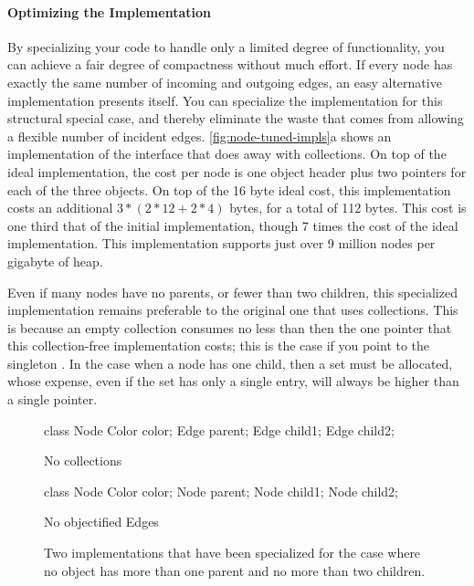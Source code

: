 \paragraph{Optimizing the Implementation}
By specializing your code to handle only a limited degree of functionality, you
can achieve a fair degree of compactness without much effort. If every node has
exactly the same number of incoming and outgoing edges, an easy alternative
implementation presents itself. You can specialize the implementation for this
structural special case, and thereby eliminate the waste that comes from allowing
a flexible number of incident edges.
\autoref{fig:node-tuned-impls}a shows an implementation of the 
interface that does away with collections. On top of the ideal implementation,
the cost per node is one object header plus two pointers for each of the three
 objects. On top of the 16 byte ideal cost, this implementation costs
an additional $3*(2*12 + 2*4)$ bytes, for a total of 112 bytes. This cost is one
third that of the initial implementation, though 7 times the cost of the ideal
implementation. This implementation supports just over 9 million nodes per
gigabyte of heap.

Even if many nodes have no parents, or fewer than two children, this specialized
implementation remains preferable to the original one that uses collections. This
is because an empty collection consumes no less than then the one pointer that
this collection-free implementation costs; this is the case if you point to the
singleton . In the case when a node has one child,
then a set must be allocated, whose expense, even if the set has only a single
entry, will always be higher than a single pointer.

\begin{figure}
\centering
\begin{subfloat}
\begin{minipage}[b]{0.38\textwidth}
\begin{shortlisting}
class Node {
   Color color;
   Edge parent;
   Edge child1;
   Edge child2;
}
\end{shortlisting}
\end{minipage}
\label{fig:node-no-collections}
\caption{No collections}
\end{subfloat}
\qquad
\begin{subfloat}
\begin{minipage}[b]{0.38\textwidth}
\begin{shortlisting}
class Node {
   Color color;
   Node parent;
   Node child1;
   Node child2;
}
\end{shortlisting} 
\end{minipage}
\caption{No objectified Edges}
\label{fig:node-no-Edge-objects}
\end{subfloat}
\caption{Two implementations that have been specialized for the case where
no object has more than one parent and no more than two children.}
\label{fig:node-tuned-impls}
\end{figure} 

